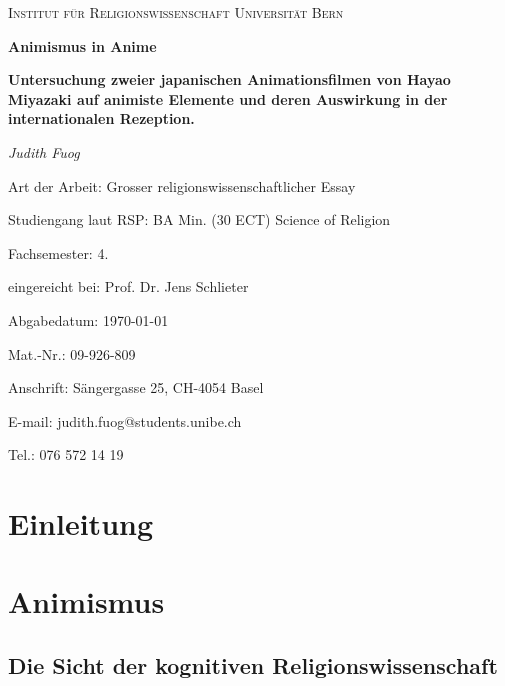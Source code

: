 \documentclass[a4paper]{article}
\begin{document}
\begin{titlepage}
	\begin{center}
	{\scshape\LARGE Institut für Religionswissenschaft Universität Bern \par}
	\vspace{1cm}
	{\huge\bfseries Animismus in Anime\par}
	{\large\bfseries Untersuchung zweier japanischen Animationsfilmen von Hayao Miyazaki auf animiste Elemente und deren Auswirkung in der internationalen Rezeption.\par}
	\vspace{2cm}
	{\Large\itshape Judith Fuog\par}
	\vfill
	\end{center}

\begin{minipage}{\textwidth}
	\begin{large}
	Art der Arbeit: Grosser religionswissenschaftlicher Essay\par
	Studiengang laut RSP: BA Min. (30 ECT) Science of Religion\par
	Fachsemester: 4.\par
	\hfill

	eingereicht bei: Prof. Dr. Jens Schlieter\par
	Abgabedatum: \today\par
	\hfill

	Mat.-Nr.: 09-926-809\par
	Anschrift: Sängergasse 25, CH-4054 Basel\par
	E-mail: judith.fuog@students.unibe.ch\par
	Tel.: 076 572 14 19\par
	\end{large}
\end{minipage}
\hfill
\end{titlepage}
\newpage
\tableofcontents
\newpage

\section*{Einleitung}


\section{Animismus}

\subsection{Die Sicht der kognitiven Religionswissenschaft}

\end{document}
